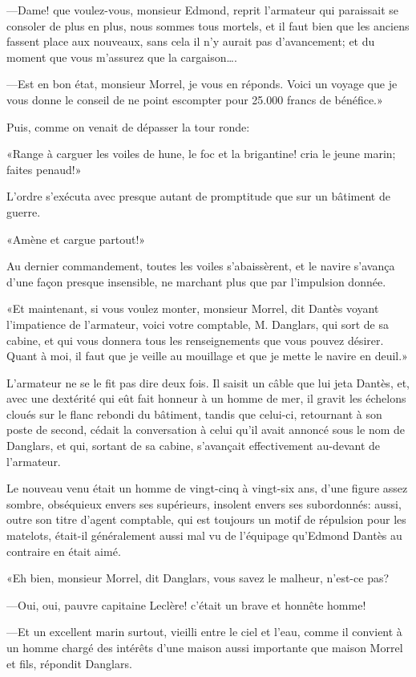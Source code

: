 —Dame! que voulez-vous, monsieur Edmond, reprit l'armateur qui paraissait se consoler de plus en plus, nous sommes tous mortels, et il faut bien que les anciens fassent place aux nouveaux, sans cela il n'y aurait pas d'avancement; et du moment que vous m'assurez que la cargaison\dots.

—Est en bon état, monsieur Morrel, je vous en réponds. Voici un voyage que je vous donne le conseil de ne point escompter pour 25.000 francs de bénéfice.»

Puis, comme on venait de dépasser la tour ronde:

«Range à carguer les voiles de hune, le foc et la brigantine! cria le jeune marin; faites penaud!»

L'ordre s'exécuta avec presque autant de promptitude que sur un bâtiment de guerre.

«Amène et cargue partout!»

Au dernier commandement, toutes les voiles s'abaissèrent, et le navire s'avança d'une façon presque insensible, ne marchant plus que par l'impulsion donnée.

«Et maintenant, si vous voulez monter, monsieur Morrel, dit Dantès voyant l'impatience de l'armateur, voici votre comptable, M. Danglars, qui sort de sa cabine, et qui vous donnera tous les renseignements que vous pouvez désirer. Quant à moi, il faut que je veille au mouillage et que je mette le navire en deuil.»

L'armateur ne se le fit pas dire deux fois. Il saisit un câble que lui jeta Dantès, et, avec une dextérité qui eût fait honneur à un homme de mer, il gravit les échelons cloués sur le flanc rebondi du bâtiment, tandis que celui-ci, retournant à son poste de second, cédait la conversation à celui qu'il avait annoncé sous le nom de Danglars, et qui, sortant de sa cabine, s'avançait effectivement au-devant de l'armateur.

Le nouveau venu était un homme de vingt-cinq à vingt-six ans, d'une figure assez sombre, obséquieux envers ses supérieurs, insolent envers ses subordonnés: aussi, outre son titre d'agent comptable, qui est toujours un motif de répulsion pour les matelots, était-il généralement aussi mal vu de l'équipage qu'Edmond Dantès au contraire en était aimé.

«Eh bien, monsieur Morrel, dit Danglars, vous savez le malheur, n'est-ce pas?

—Oui, oui, pauvre capitaine Leclère! c'était un brave et honnête homme!

—Et un excellent marin surtout, vieilli entre le ciel et l'eau, comme il convient à un homme chargé des intérêts d'une maison aussi importante que maison Morrel et fils, répondit Danglars.

